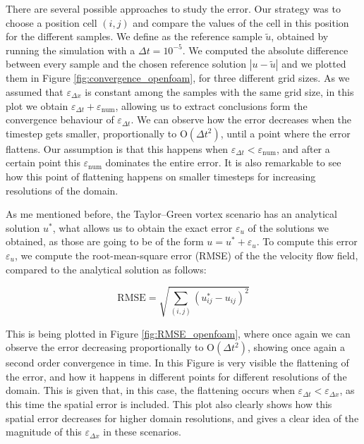 \documentclass[
  english,        %
  font=times,     %
  onecolumn,      %
]{tumarticle}
\begin{document}
There are several possible approaches to study the error. Our strategy was to choose a position cell $(i,j)$ and compare the values of the cell in this position for the different samples. We define as the reference sample $\tilde{u}$, obtained by running the simulation with a $\Delta t = 10^{-5}$. 
We computed the absolute difference between every sample and the chosen reference solution $|u - \tilde{u}|$ and we plotted them in Figure \ref{fig:convergence_openfoam}, for three different grid sizes. As we assumed that $\varepsilon_{\Delta x}$ is constant among the samples with the same grid size, in this plot we obtain $\varepsilon_{\Delta t} + \varepsilon_\text{num}$, allowing us to extract conclusions form the convergence behaviour of $\varepsilon_{\Delta t}$. We can observe how the error decreases when the timestep gets smaller, proportionally to $\text{O}(\Delta t^2)$, until a point where the error flattens. Our assumption is that this happens when $\varepsilon_{\Delta t} < \varepsilon_\text{num}$, and after a certain point this $\varepsilon_\text{num}$ dominates the entire error. It is also remarkable to see how this point of flattening happens on smaller timesteps for increasing resolutions of the domain.

As me mentioned before, the Taylor–Green vortex scenario has an analytical solution $u^*$, what allows us to obtain the exact error $\varepsilon_{u}$ of the solutions we obtained, as those are going to be of the form $u = u^* + \varepsilon_{u}$. To compute this error $\varepsilon_{u}$, we compute the root-mean-square error (RMSE) of the the velocity flow field, compared to the analytical solution as follows:  

\begin{equation}
    \text{RMSE} = \sqrt{\sum_{(i,j)} (u^*_{ij} - u_{ij})^2 }
\end{equation}

This is being plotted in Figure \ref{fig:RMSE_openfoam}, where once again we can observe the error decreasing proportionally to $\text{O}(\Delta t^2)$, showing once again a second order convergence in time. In this Figure is very visible the flattening of the error, and how it happens in different points for different resolutions of the domain. This is given that, in this case, the flattening occurs when $\varepsilon_{\Delta t} < \varepsilon_{\Delta x}$, as this time the spatial error is included. This plot also clearly shows how this spatial error decreases for higher domain resolutions, and gives a clear idea of the magnitude of this $\varepsilon_{\Delta x}$ in these scenarios. 
\end{document}
